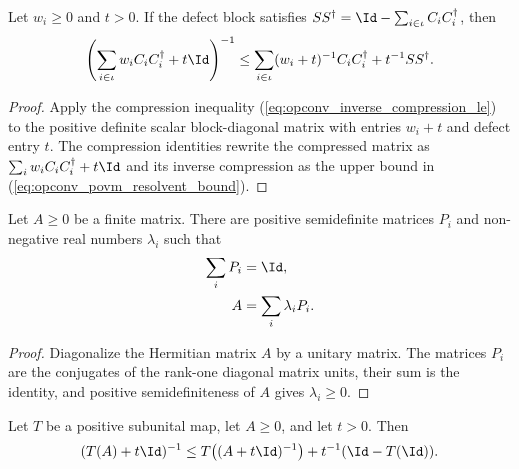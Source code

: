 \begin{lemma}\label{lem:operator_jensen_povm_resolvent}
    \leanok
    Let $w_i\ge0$ and $t>0$. If the defect block satisfies
    $SS^\dagger=\Id-\sum_{i\in\iota}C_iC_i^\dagger$, then
    \begin{align}
        \left(\sum_{i\in\iota}w_iC_iC_i^\dagger+t\Id\right)^{-1}
        \le
        \sum_{i\in\iota}(w_i+t)^{-1}C_iC_i^\dagger+t^{-1}SS^\dagger.
        \label{eq:opconv_povm_resolvent_bound}
    \end{align}
\end{lemma}

\begin{proof}
    \leanok
    Apply the compression inequality
    (\ref{eq:opconv_inverse_compression_le}) to the positive definite
    scalar block-diagonal matrix with entries $w_i+t$ and defect entry $t$.
    The compression identities rewrite the compressed matrix as
    $\sum_iw_iC_iC_i^\dagger+t\Id$ and its inverse compression as the upper
    bound in (\ref{eq:opconv_povm_resolvent_bound}).
\end{proof}

\begin{lemma}\label{lem:operator_jensen_spectral_resolution}
    \leanok
    Let $A\ge0$ be a finite matrix. There are positive semidefinite matrices
    $P_i$ and non-negative real numbers $\lambda_i$ such that
    \begin{align}
        \sum_iP_i&=\Id, \notag\\
        A&=\sum_i\lambda_iP_i.
        \notag
    \end{align}
\end{lemma}

\begin{proof}
    \leanok
    Diagonalize the Hermitian matrix $A$ by a unitary matrix. The matrices
    $P_i$ are the conjugates of the rank-one diagonal matrix units, their sum is
    the identity, and positive semidefiniteness of $A$ gives $\lambda_i\ge0$.
\end{proof}

\begin{lemma}\label{lem:operator_jensen_positive_map_resolvent}
    \leanok
    Let $T$ be a positive subunital map, let $A\ge0$, and let $t>0$. Then
    \begin{align}
        (T(A)+t\Id)^{-1}
        \le
        T\!\left((A+t\Id)^{-1}\right)+t^{-1}(\Id-T(\Id)).
        \notag
    \end{align}
\end{lemma}

